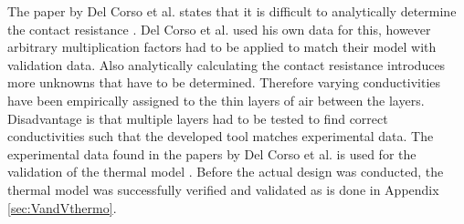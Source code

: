 The paper by Del Corso et al. states that it is difficult to analytically determine the contact resistance \cite{Corso2009}. Del Corso et al. used his own data for this, however arbitrary multiplication factors had to be applied to match their model with validation data. Also analytically calculating the contact resistance introduces more unknowns that have to be determined. Therefore varying conductivities have been empirically assigned to the thin layers of air between the layers. Disadvantage is that multiple layers had to be tested to find correct conductivities such that the developed tool matches experimental data. The experimental data found in the papers by Del Corso et al. is used for the validation of the thermal model \cite{Corso2009,Corso2011}. Before the actual design was conducted, the thermal model was successfully verified and validated as is done in Appendix \ref{sec:VandVthermo}.




